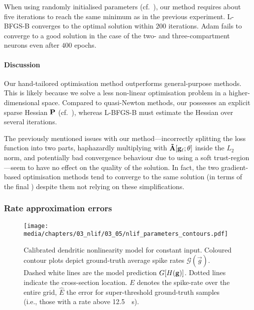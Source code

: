 When using randomly initialised parameters (cf.~), our method requires about five iterations to reach the same minimum as in the previous experiment.
L-BFGS-B converges to the optimal solution within $200$ iterations.
Adam fails to converge to a good solution in the case of the two- and three-compartment neurons even after $400$ epochs.

\paragraph{Discussion}
Our hand-tailored optimisation method outperforms general-purpose methods.
This is likely because we solve a less non-linear optimisation problem in a higher-dimensional space.
Compared to quasi-Newton methods, our \QP possesses an explicit sparse Hessian $\mathbf{P}$ (cf.~), whereas L-BFGS-B must estimate the Hessian over several iterations.

The previously mentioned issues with our method---incorrectly splitting the loss function into two parts, haphazardly multiplying with $\mathbf{\tilde A}[\mathbf{g}_\ell; \mathbf{\theta}]$ inside the $L_2$ norm, and potentially bad convergence behaviour due to using a soft trust-region---seem to have no effect on the quality of the solution.
In fact, the two gradient-based optimisation methods tend to converge to the same solution (in terms of the final \NRMSE) despite them not relying on these simplifications.

\subsubsection{Rate approximation errors}

\begin{figure}[t]
	\texttt{[image: media/chapters/03\_nlif/03\_05/nlif\_parameters\_contours.pdf]}
	\caption[Calibrated $n$-LIF dendritic nonlinearity model for constant input]{
		Calibrated \nlif dendritic nonlinearity model for constant input.
		Coloured contour plots depict ground-truth average spike rates $\mathscr{G}(\vec g)$.
		Dashed white lines are the model prediction $G[{H}(\mathbf{g})]$. Dotted lines indicate the cross-section location.
		$E$ denotes the spike-rate \RMSE over the entire grid, $\hat E$ the error for super-threshold ground-truth samples (i.e., those with a rate above \SI{12.5}{\per\second}).
	}
	\label{fig:nlif_parameters_contours}
\end{figure}

